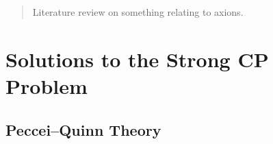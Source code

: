 





\begin{abstract}
	Literature review on something relating to axions.
\end{abstract}

\tableofcontents
\newpage
{}




\chapter{Solutions to the Strong CP Problem}
\section{Peccei–Quinn Theory}
% 


\printbibliography




